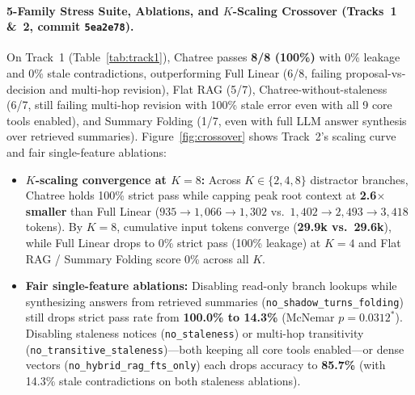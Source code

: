 \documentclass[10pt,twocolumn]{article}
\begin{document}
\paragraph{5-Family Stress Suite, Ablations, and $K$-Scaling Crossover (Tracks~1 \&~2, commit \texttt{5ea2e78}).}
On Track~1 (Table~\ref{tab:track1}), Chatree passes \textbf{8/8 (100\%)} with 0\% leakage and 0\% stale contradictions, outperforming Full Linear (6/8, failing proposal-vs-decision and multi-hop revision), Flat RAG (5/7), Chatree-without-staleness (6/7, still failing multi-hop revision with 100\% stale error even with all 9 core tools enabled), and Summary Folding (1/7, even with full LLM answer synthesis over retrieved summaries). Figure~\ref{fig:crossover} shows Track~2's scaling curve and fair single-feature ablations:
\begin{itemize}
  \item \textbf{$K$-scaling convergence at $K=8$:} Across $K \in \{2,4,8\}$ distractor branches, Chatree holds 100\% strict pass while capping peak root context at \textbf{2.6$\times$ smaller} than Full Linear ($935 \to 1{,}066 \to 1{,}302$ vs.\ $1{,}402 \to 2{,}493 \to 3{,}418$ tokens). By $K=8$, cumulative input tokens converge (\textbf{29.9k vs.\ 29.6k}), while Full Linear drops to 0\% strict pass (100\% leakage) at $K=4$ and Flat RAG / Summary Folding score 0\% across all $K$.
  \item \textbf{Fair single-feature ablations:} Disabling read-only branch lookups while synthesizing answers from retrieved summaries (\texttt{no\_shadow\_turns\_folding}) still drops strict pass rate from \textbf{100.0\% to 14.3\%} (McNemar $p=0.0312^*$). Disabling staleness notices (\texttt{no\_staleness}) or multi-hop transitivity (\texttt{no\_transitive\_staleness})—both keeping all core tools enabled—or dense vectors (\texttt{no\_hybrid\_rag\_fts\_only}) each drops accuracy to \textbf{85.7\%} (with 14.3\% stale contradictions on both staleness ablations).
\end{itemize}
\end{document}
